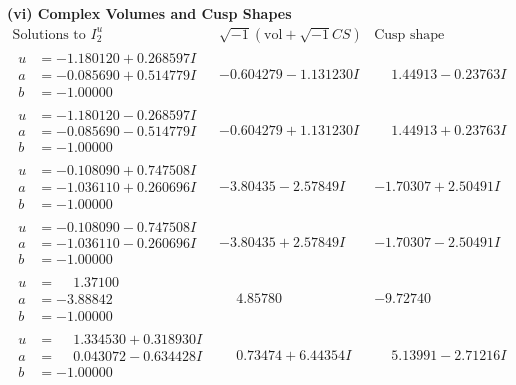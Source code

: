 \documentclass[1p]{elsarticle_modified}
\theoremstyle{definition}
\newcommand{\I}{\sqrt{-1}}
\begin{document}
\newpage\flushleft \textbf{(vi) Complex Volumes and Cusp Shapes}
$$\begin{array}{c|c|c}  
\text{Solutions to }I^u_{2}& \I (\text{vol} + \sqrt{-1}CS) & \text{Cusp shape}\\
 \hline 
\begin{aligned}
u &= -1.180120 + 0.268597 I \\
a &= -0.085690 + 0.514779 I \\
b &= -1.00000\phantom{ +0.000000I}\end{aligned}
 & -0.604279 - 1.131230 I & \phantom{-}1.44913 - 0.23763 I \\ \hline\begin{aligned}
u &= -1.180120 - 0.268597 I \\
a &= -0.085690 - 0.514779 I \\
b &= -1.00000\phantom{ +0.000000I}\end{aligned}
 & -0.604279 + 1.131230 I & \phantom{-}1.44913 + 0.23763 I \\ \hline\begin{aligned}
u &= -0.108090 + 0.747508 I \\
a &= -1.036110 + 0.260696 I \\
b &= -1.00000\phantom{ +0.000000I}\end{aligned}
 & -3.80435 - 2.57849 I & -1.70307 + 2.50491 I \\ \hline\begin{aligned}
u &= -0.108090 - 0.747508 I \\
a &= -1.036110 - 0.260696 I \\
b &= -1.00000\phantom{ +0.000000I}\end{aligned}
 & -3.80435 + 2.57849 I & -1.70307 - 2.50491 I \\ \hline\begin{aligned}
u &= \phantom{-}1.37100\phantom{ +0.000000I} \\
a &= -3.88842\phantom{ +0.000000I} \\
b &= -1.00000\phantom{ +0.000000I}\end{aligned}
 & \phantom{-}4.85780\phantom{ +0.000000I} & -9.72740\phantom{ +0.000000I} \\ \hline\begin{aligned}
u &= \phantom{-}1.334530 + 0.318930 I \\
a &= \phantom{-}0.043072 - 0.634428 I \\
b &= -1.00000\phantom{ +0.000000I}\end{aligned}
 & \phantom{-}0.73474 + 6.44354 I & \phantom{-}5.13991 - 2.71216 I \\ \hline\begin{aligned}

\end{aligned}
\end{array}$$
\end{document}
